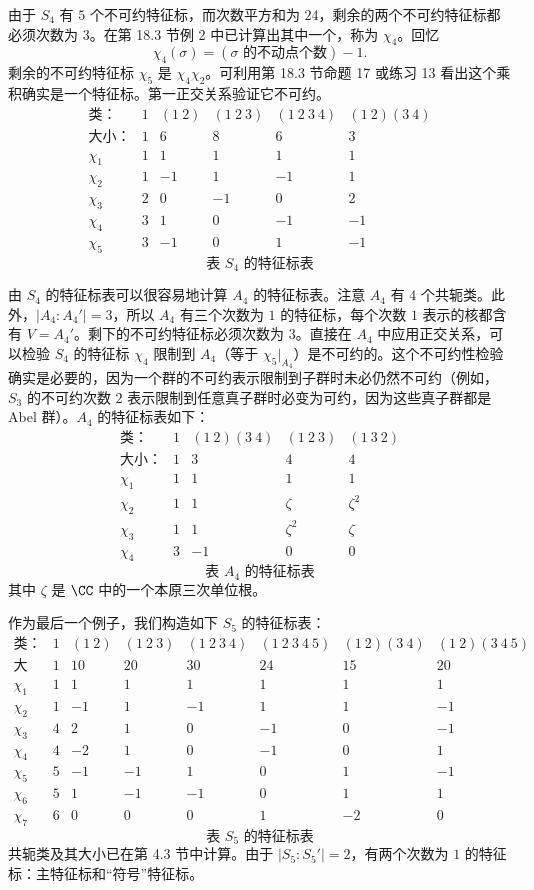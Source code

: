 由于 $S_4$ 有 $5$ 个不可约特征标，而次数平方和为 $24$，剩余的两个不可约特征标都必须次数为 $3$。在第 18.3 节例 2 中已计算出其中一个，称为 $\chi_4$。回忆
\[
  \chi_4(\sigma)=(\sigma\text{ 的不动点个数})-1.
\]
剩余的不可约特征标 $\chi_5$ 是 $\chi_4\chi_2$。可利用第 18.3 节命题 17 或练习 13 看出这个乘积确实是一个特征标。第一正交关系验证它不可约。
\[
\begin{array}{c|ccccc}
\text{类：} & 1 & (1\ 2) & (1\ 2\ 3) & (1\ 2\ 3\ 4) & (1\ 2)(3\ 4)\\
\text{大小：} & 1 & 6 & 8 & 6 & 3\\\hline
\chi_1 & 1 & 1 & 1 & 1 & 1\\
\chi_2 & 1 & -1 & 1 & -1 & 1\\
\chi_3 & 2 & 0 & -1 & 0 & 2\\
\chi_4 & 3 & 1 & 0 & -1 & -1\\
\chi_5 & 3 & -1 & 0 & 1 & -1
\end{array}
\]
\[
\text{表 }S_4\text{ 的特征标表}
\]

由 $S_4$ 的特征标表可以很容易地计算 $A_4$ 的特征标表。注意 $A_4$ 有 $4$ 个共轭类。此外，$|A_4:A_4'|=3$，所以 $A_4$ 有三个次数为 $1$ 的特征标，每个次数 $1$ 表示的核都含有 $V=A_4'$。剩下的不可约特征标必须次数为 $3$。直接在 $A_4$ 中应用正交关系，可以检验 $S_4$ 的特征标 $\chi_4$ 限制到 $A_4$（等于 $\chi_5|_{A_4}$）是不可约的。这个不可约性检验确实是必要的，因为一个群的不可约表示限制到子群时未必仍然不可约（例如，$S_3$ 的不可约次数 $2$ 表示限制到任意真子群时必变为可约，因为这些真子群都是 Abel 群）。$A_4$ 的特征标表如下：
\[
\begin{array}{c|cccc}
\text{类：} & 1 & (1\ 2)(3\ 4) & (1\ 2\ 3) & (1\ 3\ 2)\\
\text{大小：} & 1 & 3 & 4 & 4\\\hline
\chi_1 & 1 & 1 & 1 & 1\\
\chi_2 & 1 & 1 & \zeta & \zeta^2\\
\chi_3 & 1 & 1 & \zeta^2 & \zeta\\
\chi_4 & 3 & -1 & 0 & 0
\end{array}
\]
\[
\text{表 }A_4\text{ 的特征标表}
\]
其中 $\zeta$ 是 $\CC$ 中的一个本原三次单位根。

作为最后一个例子，我们构造如下 $S_5$ 的特征标表：
{\scriptsize
\[
\begin{array}{c|ccccccc}
\text{类：} & 1 & (1\ 2) & (1\ 2\ 3) & (1\ 2\ 3\ 4) & (1\ 2\ 3\ 4\ 5) & (1\ 2)(3\ 4) & (1\ 2)(3\ 4\ 5)\\
\text{大小：} & 1 & 10 & 20 & 30 & 24 & 15 & 20\\\hline
\chi_1 & 1 & 1 & 1 & 1 & 1 & 1 & 1\\
\chi_2 & 1 & -1 & 1 & -1 & 1 & 1 & -1\\
\chi_3 & 4 & 2 & 1 & 0 & -1 & 0 & -1\\
\chi_4 & 4 & -2 & 1 & 0 & -1 & 0 & 1\\
\chi_5 & 5 & -1 & -1 & 1 & 0 & 1 & -1\\
\chi_6 & 5 & 1 & -1 & -1 & 0 & 1 & 1\\
\chi_7 & 6 & 0 & 0 & 0 & 1 & -2 & 0
\end{array}
\]
\[
\text{表 }S_5\text{ 的特征标表}
\]
}
共轭类及其大小已在第 4.3 节中计算。由于 $|S_5:S_5'|=2$，有两个次数为 $1$ 的特征标：主特征标和“符号”特征标。

